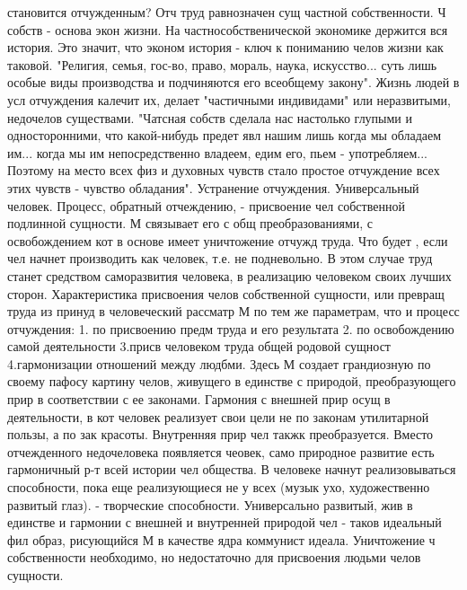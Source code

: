\documentclass[12pt]{article}
\begin{document}
становится отчужденным?
Отч труд равнозначен сущ частной собственности. Ч собств - основа экон жизни. На частнособственической
экономике держится вся история. Это значит, что эконом история - ключ к пониманию челов жизни как таковой.
"Религия, семья, гос-во, право, мораль, наука, искусство... суть лишь особые виды производства и подчиняются
его всеобщему закону". Жизнь людей в усл отчуждения калечит их, делает "частичными индивидами" или
неразвитыми, недочелов существами. "Чатсная собств сделала нас настолько глупыми и односторонними, что
какой-нибудь предет явл нашим лишь когда мы обладаем им... когда мы им непосредственно владеем, едим его,
пьем - употребляем... Поэтому на место всех физ и духовных чувств стало простое отчуждение всех этих чувств
- чувство обладания".
Устранение  отчуждения.  Универсальный  человек.  Процесс,  обратный  отчеждению,  -  присвоение  чел
собственной подлинной сущности. М связывает его с общ преобразованиями, с освобождением кот в основе
имеет уничтожение отчужд труда. Что будет , если чел начнет производить как человек, т.е. не подневольно. В
этом случае труд станет средством саморазвития человека, в реализацию человеком своих лучших сторон.
Характеристика  присвоения  челов  собственной  сущности,  или  превращ  труда  из  принуд  в  человеческий
рассматр М по тем же параметрам, что и процесс отчуждения: 1. по присвоению предм труда и его результата 2.
по  освобождению  самой  деятельности  3.присв  человеком  труда  общей  родовой  сущност  4.гармонизации
отношений между людбми.
Здесь  М  создает  грандиозную  по  своему  пафосу  картину  челов,  живущего  в  единстве  с  природой,
преобразующего прир в соответствии с ее законами. Гармония с внешней прир осущ в деятельности, в кот
человек реализует свои цели не по законам утилитарной пользы, а по зак красоты. Внутренняя прир чел такжк
преобразуется.  Вместо  отчежденного  недочеловека  появляется  чеовек,  само  природное  развитие  есть
гармоничный  р-т  всей  истории  чел  общества.  В  человеке  начнут  реализовываться  способности,  пока  еще
реализующиеся не у всех (музык ухо, художественно развитый глаз). - творческие способности.
Универсально развитый, жив в единстве и гармонии с внешней и внутренней природой чел - таков идеальный
фил образ, рисующийся М в качестве ядра коммунист идеала. Уничтожение ч собственности необходимо, но
недостаточно для присвоения людьми челов сущности.

\newpage
\end{document}
